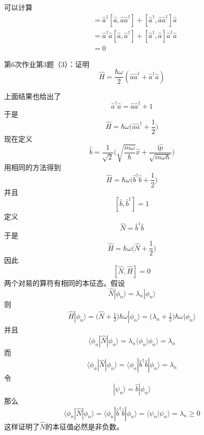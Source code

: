         可以计算
        \begin{align*}
            [\hat{a}^\dagger\hat{a}, \hat{a}\hat{a}^\dagger] &= \hat{a}^\dagger [\hat{a},\hat{a}\hat{a}^\dagger] +  [\hat{a}^\dagger,\hat{a}\hat{a}^\dagger]\hat{a}\\
            &= \hat{a}^\dagger\hat{a}[\hat{a},\hat{a}^\dagger] + [\hat{a}^\dagger,\hat{a}]\hat{a}^\dagger \hat{a}\\
            &= 0
        \end{align*}
        \begin{asg}
            第6次作业第3题（3）：证明
            \[ \hat{H} = \frac {\hbar \omega}2 (\hat{a}\hat{a}^\dagger + \hat{a}^\dagger \hat{a}) \]
        \end{asg}
        上面结果也给出了
        \[ \hat{a}^\dagger\hat{a} = \hat{a}\hat{a}^\dagger + 1 \]
        于是
        \[ \hat{H} = \hbar \omega\bigg(\hat{a}\hat{a}^\dagger + \frac 12\bigg)\]
        现在定义
        \[ \hat{b} = \frac 1{\sqrt{2}}\bigg(\sqrt{\frac {m\omega}{\hbar}}\hat{x} + \frac {\mathrm{i}\hat{p}}{\sqrt{m\omega\hbar}}\bigg) \]
        用相同的方法得到 
        \[ \hat{H} = \hbar \omega\bigg(\hat{b}^\dagger\hat{b}+ \frac 12\bigg) \]
        并且
        \[ [\hat{b}, \hat{b}^\dagger] = 1 \]
        定义
        \[ \hat{N} = \hat{b}^\dagger\hat{b} \]
        于是
        \[ \hat{H} = \hbar \omega \bigg(\hat{N}+\frac 12\bigg) \]
        因此 
        \[ [\hat{N},\hat{H}] = 0 \]
        两个对易的算符有相同的本征态。假设
        \[ \hat{N}|\phi_n \rangle = \lambda_n |\phi_n \rangle \]
        则
        \begin{align*}
            \hat{H}|\phi_n \rangle = \bigg(\hat{N}+\frac 12\bigg)\hbar\omega|\phi_n \rangle = \bigg(\lambda_n + \frac 12\bigg)\hbar\omega|\phi_n\rangle
        \end{align*}
        并且
        \[ \langle \phi_n|\hat{N}|\phi_n \rangle = \lambda_n \langle \phi_n |\phi_n \rangle = \lambda_n \]
        而
        \[ \langle \phi_n|\hat{N}|\phi_n \rangle =  \langle \phi_n |\hat{b}^\dagger\hat{b}|\phi_n \rangle = \lambda_n \]
        令
        \[ |\psi_n \rangle = \hat{b}|\phi_n\rangle \]
        那么
        \[ \langle \phi_n|\hat{N}|\phi_n \rangle =  \langle \phi_n |\hat{b}^\dagger\hat{b}|\phi_n \rangle = \langle \psi_n|\psi_n \rangle = \lambda_n \geqslant 0 \]
        这样证明了$\hat{N}$的本征值必然是非负数。

